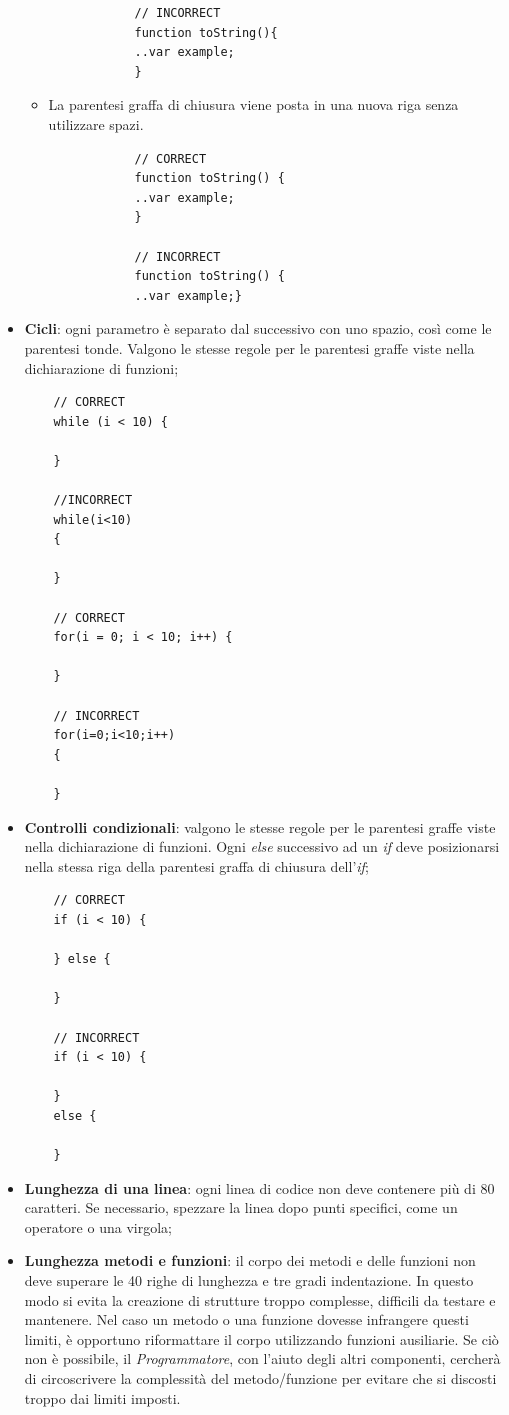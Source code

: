 \begin{itemize}
\begin{itemize}
\begin{lstlisting}
			// INCORRECT
			function toString(){    
			..var example;
			}
			\end{lstlisting}
			\item{La parentesi graffa di chiusura viene posta in una nuova riga senza utilizzare spazi.}
			\begin{lstlisting}
			// CORRECT
			function toString() {  
			..var example;
			}
			
			// INCORRECT
			function toString() {    
			..var example;}
			\end{lstlisting}
		\end{itemize}
	
	\item{\textbf{Cicli}: ogni parametro è separato dal successivo con uno spazio, così come le parentesi tonde. Valgono le stesse regole per le parentesi graffe viste nella dichiarazione di funzioni;
	\begin{lstlisting}
	// CORRECT
	while (i < 10) {  
	
	}
	
	//INCORRECT
	while(i<10)  
	{  
	
	}
	
	// CORRECT
	for(i = 0; i < 10; i++) {  
		
	}
	
	// INCORRECT
	for(i=0;i<10;i++)  
	{  
	
	}
	\end{lstlisting}	
	}

	\item{\textbf{Controlli condizionali}: valgono le stesse regole per le parentesi graffe viste nella dichiarazione di funzioni. Ogni \emph{else} successivo ad un \emph{if} deve posizionarsi nella stessa riga della parentesi graffa di chiusura dell'\emph{if};}
	\begin{lstlisting}
	// CORRECT
	if (i < 10) {  
	
	} else {
	
	}
	
	// INCORRECT
	if (i < 10) {    
	
	} 
	else {
	
	}
	\end{lstlisting}	
	
	\item{\textbf{Lunghezza di una linea}: ogni linea di codice non deve contenere più di 80 caratteri. Se necessario, spezzare la linea dopo punti specifici, come un operatore o una virgola;}
	
	\item{\textbf{Lunghezza metodi e funzioni}: il corpo dei metodi e delle funzioni non deve superare le 40 righe di lunghezza e tre gradi indentazione. In questo modo si evita la creazione di strutture troppo complesse, difficili da testare e mantenere. Nel caso un metodo o una funzione dovesse infrangere questi limiti, è opportuno riformattare il corpo utilizzando funzioni ausiliarie. Se ciò non è possibile, il \emph{Programmatore}, con l'aiuto degli altri componenti, cercherà di circoscrivere la complessità del metodo/funzione per evitare che si discosti troppo dai limiti imposti.}
	
	
\end{itemize}


